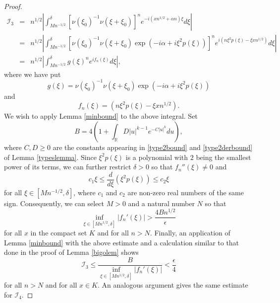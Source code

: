 \documentclass{article}
\theoremstyle{theorem}
\theoremstyle{remark}
\begin{document}
\begin{proof}
\begin{eqnarray*}
\mathcal{I}_3&=& n^{1/2}\left|\int_{Mn^{-1/2}}^{\delta}[\nu(\xi_0)^{-1}\nu(\xi+\xi_0)]^ne^{-i(xn^{1/2}+\alpha n)\xi}d\xi\right|\\
&=&n^{1/2}\left|\int_{Mn^{-1/2}}^{\delta}[\nu(\xi_0)^{-1}\nu(\xi+\xi_0)\exp(-i\alpha+i\xi^2p(\xi))]^ne^{i(n\xi^2p(\xi)-\xi xn^{1/2})}d\xi\right|\\
&=&n^{1/2}\left|\int_{Mn^{-1/2}}^{\delta}g(\xi)^n e^{if_n(\xi)}d\xi\right|,
\end{eqnarray*}
where we have put
\begin{equation*}
g(\xi)=\nu(\xi_0)^{-1}\nu(\xi+\xi_0)\exp(-i\alpha+i\xi^2p(\xi))
\end{equation*}
and
\begin{equation*}
f_n(\xi)=(n\xi^2p(\xi)-\xi xn^{1/2}).
\end{equation*}
We wish to apply Lemma \ref{minbound} to the above integral. Set
\begin{equation*}
B=4\left(1+\int_{\mathbb{R}}D|u|^{k-1}e^{-C|u|^k}du\right),
\end{equation*}
where $C,D\geq0$ are the constants appearing in \eqref{type2bound} and \eqref{type2derbound} of Lemma \ref{typeslemma}.
Since $\xi^2p(\xi)$ is a polynomial with $2$ being the smallest power of its terms, we can further restrict $\delta>0$ so that $f_n''(\xi)\neq 0$ and
\begin{equation*}
c_1 \xi\leq \frac{d}{d\xi}(\xi^2p(\xi))\leq c_2\xi
\end{equation*}
for all $\xi\in[Mn^{-1/2},\delta]$, where $c_1$ and $c_2$ are non-zero real numbers of the same sign. Consequently, we can select $M>0$ and a natural number $N$ so that 
\begin{equation*}
 \inf_{\xi\in[Mn^{1/2},\delta]}|f_n'(\xi)|>\frac{4Bn^{1/2}}{\epsilon}
\end{equation*}
for all $x$ in the compact set $K$ and for all $n>N$. Finally, an application of Lemma \ref{minbound} with the above estimate and a calculation similar to that done in the proof of Lemma \ref{bigolem} shows
\begin{equation*}
\mathcal{I}_3\leq \frac{B}{\inf_{\xi\in[Mn^{1/2},\delta]}|f_n'(\xi)|}< \frac{\epsilon}{4}
\end{equation*}
for all $n>N$ and for all $x\in K$. An analogous argument gives the same estimate for $\mathcal{I}_4$.


\end{proof}
\end{document}
